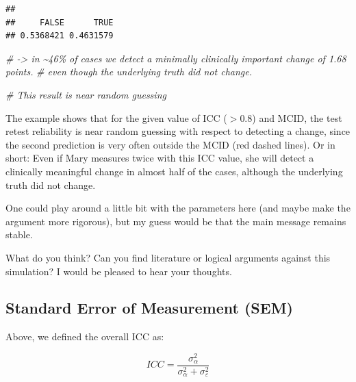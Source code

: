 \documentclass[
]{book}
\newenvironment{Shaded}{\begin{snugshade}}{\end{snugshade}}
\newcommand{\CommentTok}[1]{\textcolor[rgb]{0.56,0.35,0.01}{\textit{#1}}}
\newcommand{\FloatTok}[1]{\textcolor[rgb]{0.00,0.00,0.81}{#1}}
\newcommand{\FunctionTok}[1]{\textcolor[rgb]{0.13,0.29,0.53}{\textbf{#1}}}
\newcommand{\NormalTok}[1]{#1}
\newcommand{\SpecialCharTok}[1]{\textcolor[rgb]{0.81,0.36,0.00}{\textbf{#1}}}
\begin{document}
\begin{Shaded}
\end{Shaded}

\begin{verbatim}
## 
##     FALSE      TRUE 
## 0.5368421 0.4631579
\end{verbatim}

\begin{Shaded}
\begin{Highlighting}[]
\CommentTok{\# {-}\textgreater{} in \textasciitilde{}46\% of cases we detect a minimally clinically important change of 1.68 points.}
\CommentTok{\# even though the underlying truth did not change.}

\CommentTok{\# This result is near random guessing}
\end{Highlighting}
\end{Shaded}

The example shows that for the given value of ICC (\(>0.8\)) and MCID, the test retest reliability
is near random guessing with respect to detecting a change, since the second prediction is
very often outside the MCID (red dashed lines). Or in short: Even if Mary measures twice
with this ICC value, she will detect a clinically meaningful change in almost half of the cases,
although the underlying
truth did not change.

One could play around a little bit with the parameters here
(and maybe make the argument more rigorous),
but my guess would be that the main message remains stable.

What do you think? Can you find literature or logical arguments against this
simulation? I would be pleased to hear your thoughts.

\subsection{Standard Error of Measurement (SEM)}\label{standard-error-of-measurement-sem}

Above, we defined the overall ICC as:

\[ICC = \frac{\sigma_{\alpha}^2}{\sigma_{\alpha}^2 + \sigma_{\varepsilon}^2}\]
\end{document}
